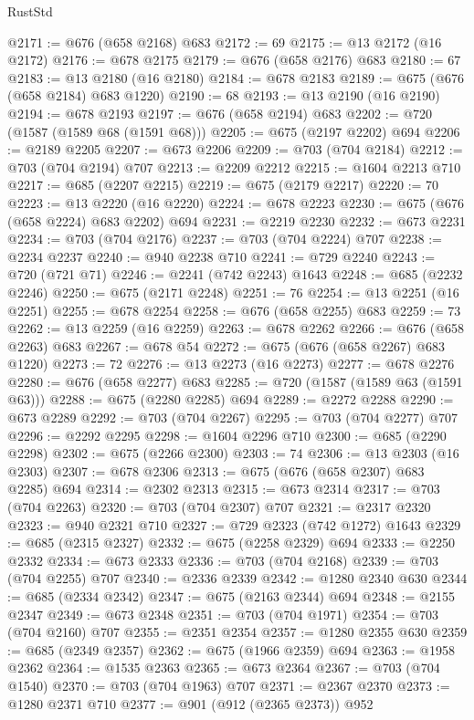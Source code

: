 \begin{lexlean}{RustStd}
\begin{coremodule}
{\begin{coremodule}
{{{{{{{{{{{{@2171 := @676 (@658 @2168) @683
@2172 := 69
@2175 := @13 @2172 (@16 @2172)
@2176 := @678 @2175
@2179 := @676 (@658 @2176) @683
@2180 := 67
@2183 := @13 @2180 (@16 @2180)
@2184 := @678 @2183
@2189 := @675 (@676 (@658 @2184) @683 @1220)
@2190 := 68
@2193 := @13 @2190 (@16 @2190)
@2194 := @678 @2193
@2197 := @676 (@658 @2194) @683
@2202 := @720 (@1587 (@1589 @68 (@1591 @68)))
@2205 := @675 (@2197 @2202) @694
@2206 := @2189 @2205
@2207 := @673 @2206
@2209 := @703 (@704 @2184)
@2212 := @703 (@704 @2194) @707
@2213 := @2209 @2212
@2215 := @1604 @2213 @710
@2217 := @685 (@2207 @2215)
@2219 := @675 (@2179 @2217)
@2220 := 70
@2223 := @13 @2220 (@16 @2220)
@2224 := @678 @2223
@2230 := @675 (@676 (@658 @2224) @683 @2202) @694
@2231 := @2219 @2230
@2232 := @673 @2231
@2234 := @703 (@704 @2176)
@2237 := @703 (@704 @2224) @707
@2238 := @2234 @2237
@2240 := @940 @2238 @710
@2241 := @729 @2240
@2243 := @720 (@721 @71)
@2246 := @2241 (@742 @2243) @1643
@2248 := @685 (@2232 @2246)
@2250 := @675 (@2171 @2248)
@2251 := 76
@2254 := @13 @2251 (@16 @2251)
@2255 := @678 @2254
@2258 := @676 (@658 @2255) @683
@2259 := 73
@2262 := @13 @2259 (@16 @2259)
@2263 := @678 @2262
@2266 := @676 (@658 @2263) @683
@2267 := @678 @54
@2272 := @675 (@676 (@658 @2267) @683 @1220)
@2273 := 72
@2276 := @13 @2273 (@16 @2273)
@2277 := @678 @2276
@2280 := @676 (@658 @2277) @683
@2285 := @720 (@1587 (@1589 @63 (@1591 @63)))
@2288 := @675 (@2280 @2285) @694
@2289 := @2272 @2288
@2290 := @673 @2289
@2292 := @703 (@704 @2267)
@2295 := @703 (@704 @2277) @707
@2296 := @2292 @2295
@2298 := @1604 @2296 @710
@2300 := @685 (@2290 @2298)
@2302 := @675 (@2266 @2300)
@2303 := 74
@2306 := @13 @2303 (@16 @2303)
@2307 := @678 @2306
@2313 := @675 (@676 (@658 @2307) @683 @2285) @694
@2314 := @2302 @2313
@2315 := @673 @2314
@2317 := @703 (@704 @2263)
@2320 := @703 (@704 @2307) @707
@2321 := @2317 @2320
@2323 := @940 @2321 @710
@2327 := @729 @2323 (@742 @1272) @1643
@2329 := @685 (@2315 @2327)
@2332 := @675 (@2258 @2329) @694
@2333 := @2250 @2332
@2334 := @673 @2333
@2336 := @703 (@704 @2168)
@2339 := @703 (@704 @2255) @707
@2340 := @2336 @2339
@2342 := @1280 @2340 @630
@2344 := @685 (@2334 @2342)
@2347 := @675 (@2163 @2344) @694
@2348 := @2155 @2347
@2349 := @673 @2348
@2351 := @703 (@704 @1971)
@2354 := @703 (@704 @2160) @707
@2355 := @2351 @2354
@2357 := @1280 @2355 @630
@2359 := @685 (@2349 @2357)
@2362 := @675 (@1966 @2359) @694
@2363 := @1958 @2362
@2364 := @1535 @2363
@2365 := @673 @2364
@2367 := @703 (@704 @1540)
@2370 := @703 (@704 @1963) @707
@2371 := @2367 @2370
@2373 := @1280 @2371 @710
@2377 := @901 (@912 (@2365 @2373)) @952
}}}}}}}}}}}}
\end{coremodule}}
\end{coremodule}
\end{lexlean}
